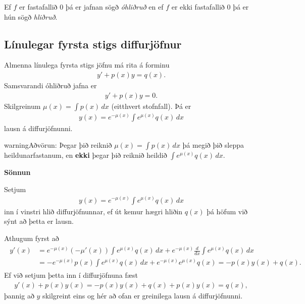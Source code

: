 \documentclass[b5paper,11pt,icelandic]{sphinxmanual}
\begin{document}
Ef \(f\) er fastafallið \(0\) þá er jafnan sögð \textit{óhliðruð}
en ef \(f\) er ekki fastafallið \(0\) þá er hún
sögð \textit{hliðruð}.


\subsection{Línulegar fyrsta stigs diffurjöfnur}
\label{kafli08:id2}\label{kafli08:index-4}
Almenna línulega fyrsta stigs jöfnu má rita á forminu
\begin{equation*}
\begin{split}y'+p(x)y=q(x).\end{split}
\end{equation*}
Samsvarandi óhliðruð jafna er
\begin{equation*}
\begin{split}y'+p(x)y=0.\end{split}
\end{equation*}
Skilgreinum \(\mu(x)=\int p(x)\,dx\) (eitthvert stofnfall). Þá er
\begin{equation*}
\begin{split}y(x)=e^{-\mu(x)}\int e^{\mu(x)}q(x)\,dx\end{split}
\end{equation*}
lausn á diffurjöfnunni.

\begin{notice}{warning}{Aðvörun:}
Þegar þið reiknið \(\mu(x)=\int p(x)\,dx\) þá megið þið sleppa
heildunarfastanum, en \textbf{ekki} þegar þið reiknið heildið
\(\int e^{\mu(x)}q(x)\,dx\).
\end{notice}

\textbf{Sönnun}

Setjum
\begin{equation*}
\begin{split}y(x)=e^{-\mu(x)}\int e^{\mu(x)}q(x)\,dx\end{split}
\end{equation*}
inn í vinstri hlið diffurjöfnunnar, ef út kemur hægri hliðin \(q(x)\) þá
höfum við sýnt að þetta er lausn.

Athugum fyrst að
\begin{equation*}
\begin{split}\begin{aligned}
y'(x) &=e^{-\mu(x)}(-\mu'(x)) \int e^{\mu(x)}q(x)\, dx + e^{-\mu(x)} \frac{d}{dx} \int e^{\mu(x)}q(x)\,dx \\
&= -e^{-\mu(x)}p(x)\int e^{\mu(x)}q(x)\, dx +  e^{-\mu(x)} e^{\mu(x)}q(x) = -p(x)y(x) + q(x).
\end{aligned}\end{split}
\end{equation*}
Ef við setjum þetta inn í diffurjöfnuna fæst
\begin{equation*}
\begin{split}y'(x) + p(x)y(x) = -p(x)y(x) + q(x) + p(x)y(x) = q(x),\end{split}
\end{equation*}
þannig að \(y\) skilgreint eins og hér að ofan er greinilega lausn á diffurjöfnunni.
\end{document}
